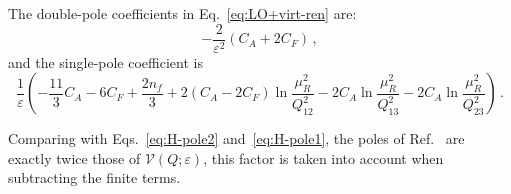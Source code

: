 
The double-pole coefficients in Eq.~\eqref{eq:LO+virt-ren} are:
\begin{equation}
  \label{eq:vN-pole2}
  -\frac{2}{\varepsilon^2}(C_A+2C_F)\,,
\end{equation}
and the single-pole coefficient is
\begin{equation}
   \label{eq:vN-pole1}
  \frac{1}{\varepsilon}\!\left(
  -\frac{11}{3}C_A-6C_F+\frac{2n_f}{3}
  +2(C_A-2C_F)\ln\frac{\mu_R^2}{Q_{12}^2}
  -2C_A\ln\frac{\mu_R^2}{Q_{13}^2}
  -2C_A\ln\frac{\mu_R^2}{Q_{23}^2}
  \right)\,.
\end{equation}

Comparing with Eqs.~\eqref{eq:H-pole2} and~\eqref{eq:H-pole1},
the poles of Ref.~\cite{Ravindran:2002dc} are exactly twice those
of $\mathcal{V}(Q;\varepsilon)$, this factor is taken into account when 
subtracting the finite terms.

